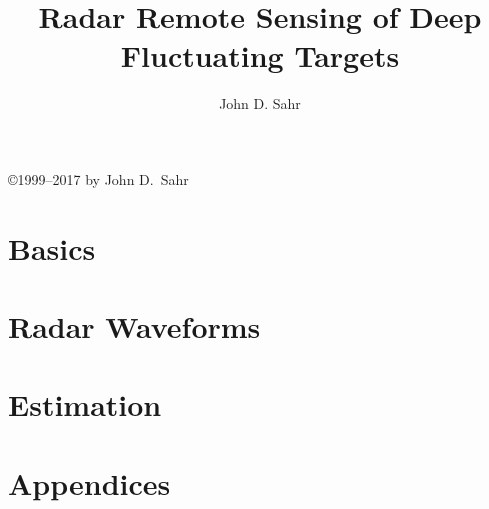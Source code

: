 \documentclass[12pt]{book}
\title{Radar Remote Sensing of Deep Fluctuating Targets}
\author{John D. Sahr}
\begin{document}
\maketitle

\rule{0mm}{0mm}
\vfill

\centerline{\copyright{1999--2017} by John D.~Sahr}

\vfill

\rule{0mm}{0mm}

\tableofcontents

\newpage

\part{Basics}





\part{Radar Waveforms}






\part{Estimation}




\part{Appendices}

\appendix







\end{document}
